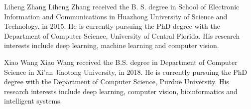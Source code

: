 \documentclass[10pt,journal,compsoc,twoside]{IEEEtran}
\begin{document}
\vspace{-12mm}
\begin{IEEEbiography}{Liheng Zhang}
Liheng Zhang received the B. S. degree in School of Electronic Information and Communications in Huazhong University of Science and Technology, in 2015. He is currently pursuing the PhD degree with the Department of Computer Science, University of Central Florida. His research interests include deep learning, machine learning and computer vision.
\end{IEEEbiography}

\vspace{-12mm}
\begin{IEEEbiography}{Xiao Wang}
Xiao Wang received the B.S. degree in Department of Computer Science in Xi'an Jiaotong University, in 2018. He is currently pursuing the PhD degree with the Department of Computer Science, Purdue University.  His research interests include deep learning, computer vision, bioinformatics and intelligent systems.
\end{IEEEbiography}





\end{document}
